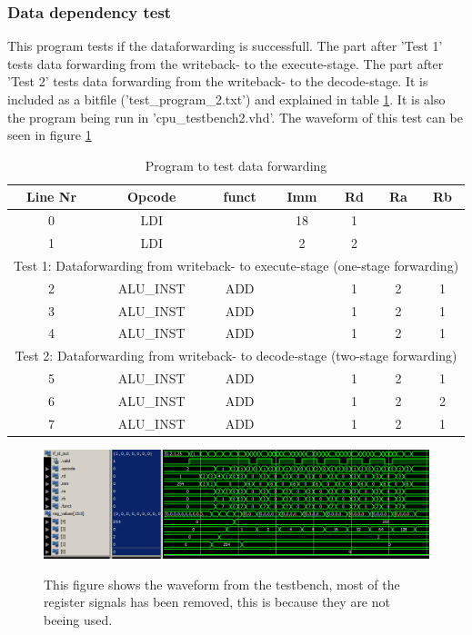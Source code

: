 \documentclass[11pt]{report}
\begin{document}
\subsubsection*{Data dependency test}

This program tests if the dataforwarding is successfull. The part after 'Test 1' tests data forwarding
from the writeback- to the execute-stage. The part after 'Test 2' tests data forwarding from the
writeback- to the decode-stage. It is included as a bitfile ('test\_program\_2.txt') and explained
in table \ref{tab:program2table}. It is also the program being run in 'cpu\_testbench2.vhd'.
The waveform of this test can be seen in figure \ref{fig:program2wave}

\begin{table}[htbp]
  \centering
  \begin{tabular}{|c|c|c|c|c|c|c|}
    \hline
    Line Nr &	Opcode		&	funct	&	Imm	&	Rd	&	Ra	&	Rb	\\\hline
    	0	&	LDI			&			&	18	&	1	&		&		\\\hline
    	1	&	LDI			&			&	2	&	2	&		&		\\\hline
	\multicolumn{7}{|c|}{Test 1: Dataforwarding from writeback- to execute-stage (one-stage forwarding)}\\\hline
    	2	&	ALU\_INST	&	ADD		&		&	1	&	2	&	1	\\\hline
    	3	&	ALU\_INST	&	ADD		&		&	1	&	2	&	1	\\\hline
    	4	&	ALU\_INST	&	ADD		&		&	1	&	2	&	1	\\\hline
	\multicolumn{7}{|c|}{Test 2: Dataforwarding from writeback- to decode-stage (two-stage forwarding)}\\\hline
    	5	&	ALU\_INST	&	ADD		&		&	1	&	2	&	1	\\\hline
    	6	&	ALU\_INST	&	ADD		&		&	1	&	2	&	2	\\\hline
    	7	&	ALU\_INST	&	ADD		&		&	1	&	2	&	1	\\\hline
  \end{tabular}
  \caption{Program to test data forwarding}
  \label{tab:program2table}
\end{table}

\begin{figure}
  \centering
  \includegraphics[width=.95\linewidth]{test3.png} \\
  \caption{This figure shows the waveform from the testbench, 
  most of the register signals has been removed, this is because they are not beeing used.}
  \label{fig:program2wave}
\end{figure}
\end{document}
